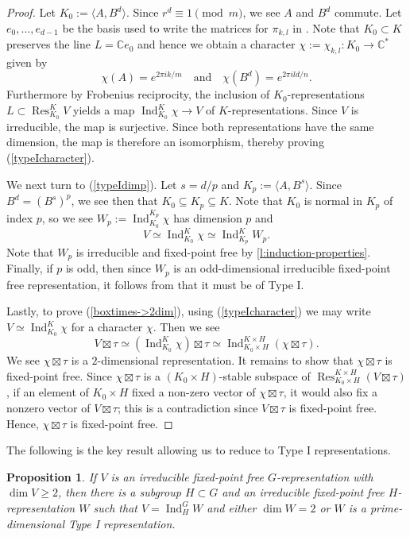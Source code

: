 \documentclass{amsart}
\newtheorem{proposition}[proposition]{Proposition}
\theoremstyle{definition}
\newcommand{\ZZ}{\mathbb{Z}}
\newcommand{\CC}{\mathbb{C}}
\DeclareMathOperator{\Res}{Res}
\DeclareMathOperator{\Ind}{Ind}
\begin{document}
\begin{proof}
Let $K_0:=\langle A,B^d\rangle$. Since $r^d\equiv1\pmod m$, we see $A$ and $B^d$ commute. Let $e_0,\dots,e_{d-1}$ be the basis used to write the matrices for $\pi_{k,l}$ in \cite[p.~822]{Stepanov}. Note that $K_0\subset K$ preserves the line $L=\CC e_0$ and hence we obtain a character $\chi:=\chi_{k,l}\colon K_0\to\CC^*$ given by
\[
    \chi(A)=e^{2\pi i k/m} \quad\textrm{and}\quad \chi(B^d)=e^{2\pi i ld/n}.
\]
Furthermore by Frobenius reciprocity, the inclusion of $K_0$-representations $L\subset\Res^K_{K_0}V$ yields a map $\Ind_{K_0}^K\chi\to V$ of $K$-representations. Since $V$ is irreducible, the map is surjective. Since both representations have the same dimension, the map is therefore an isomorphism, thereby proving (\ref{typeIcharacter}).

We next turn to (\ref{typeIdimp}). Let $s=d/p$ and $K_p:=\langle A,B^s\rangle$. Since $B^d=(B^s)^p$, we see then that $K_0\subseteq K_p\subseteq K$. Note that $K_0$ is normal in $K_p$ of index $p$, so we see $W_p:=\Ind_{K_0}^{K_p}\chi$ has dimension $p$ and 
\[
    V\simeq\Ind_{K_0}^K\chi\simeq\Ind_{K_p}^K W_p.
\]
Note that $W_p$ is irreducible and fixed-point free by \autoref{l:induction-properties}. Finally, if $p$ is odd, then since $W_p$ is an odd-dimensional irreducible fixed-point free representation, it follows from \cite[Theorem 3.6]{Stepanov} that it must be of Type I.

Lastly, to prove (\ref{boxtimes->2dim}), using (\ref{typeIcharacter}) we may write $V\simeq\Ind_{K_0}^K\chi$ for a character $\chi$. Then we see
\[
    V\boxtimes\tau \simeq (\Ind_{K_0}^K\chi)\boxtimes\tau \simeq \Ind_{K_0\times H}^{K\times H}(\chi\boxtimes\tau).
\]
We see $\chi\boxtimes\tau$ is a $2$-dimensional representation. It remains to show that $\chi\boxtimes\tau$ is fixed-point free. Since $\chi\boxtimes\tau$ is a $(K_0\times H)$-stable subspace of $\Res^{K\times H}_{K_0\times H}(V\boxtimes\tau)$, if an element of $K_0\times H$ fixed a non-zero vector of $\chi\boxtimes\tau$, it would also fix a nonzero vector of $V\boxtimes\tau$; this is a contradiction since $V\boxtimes\tau$ is fixed-point free. Hence, $\chi\boxtimes\tau$ is fixed-point free.
\end{proof}


The following is the key result allowing us to reduce to Type I representations.


\begin{proposition}\label{prop:ZVW->TypeI}
    If $V$ is an irreducible fixed-point free $G$-representation with $\dim V\geq2$, then there is a subgroup $H\subset G$ and an irreducible fixed-point free $H$-representation $W$ such that $V=\Ind^G_H W$ and either $\dim W=2$ or $W$ is a prime-dimensional Type I representation.
\end{proposition}
\end{document}
